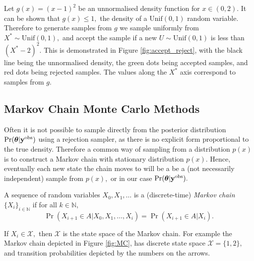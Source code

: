 \begin{example}
    Let $g(x) = (x - 1)^2$ be an unnormalised density function for
    $x \in (0,2).$ It can be shown that $g(x) \leq 1,$ 
    the density of a $\mathrm{Unif}(0,1)$ random
    variable. Therefore to generate samples from $g$ we sample uniformly from
    $X^\ast \sim \mathrm{Unif}(0, 1),$ and accept the sample if a new
    $U \sim \mathrm{Unif}(0, 1)$ is less than $(X^\ast - 2)^2.$ This is
    demonstrated in Figure \ref{fig:accept_reject}, with the black line being
    the unnormalised density, the green dots being accepted samples, and red
    dots being rejected samples. The values along the $X^\ast$ axis correspond
    to samples from $g.$
\end{example}

\subsection*{Markov Chain Monte Carlo Methods}

Often it is not possible to sample directly from the posterior distribution
$\Pr(\bm{\theta}|\mathbf{y}^{\mathrm{obs}})$ using a rejection sampler, as there is no
explicit form proportional to the true density.
Therefore a common way of sampling from a distribution $p(x)$ is
to construct a Markov chain with stationary distribution $p(x).$
Hence, eventually each new state the
chain moves to will be a be a (not necessarily independent) sample from $p(x),$
or in our case $\Pr(\bm{\theta}|\mathbf{y}^{\mathrm{obs}}).$

\begin{definition}
    A sequence of random variables
    $X_0, X_1, \dots$
    is a (discrete-time) \emph{Markov chain} $\{X_i\}_{i\in\mathbb{N}}$ if for
    all
    $k\in\mathbb{N}$,
    $$
        \Pr(X_{i+1}\in A|X_0, X_1, \dots, X_i)
        = \Pr(X_{i+1}\in A|X_i).
    $$
\end{definition}

If $X_i\in\mathcal{X},$ then $\mathcal{X}$ is the state space of the Markov
chain. For example the Markov chain depicted in Figure \ref{fig:MC}, has
discrete state space $\mathcal{X} = \{1, 2\},$ and transition probabilities
depicted by the numbers on the arrows.

